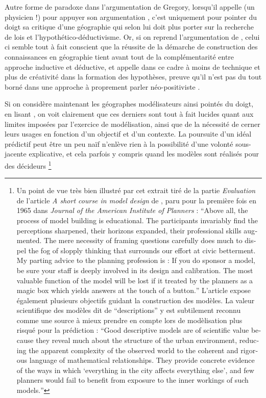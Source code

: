 Autre forme de paradoxe dans l'argumentation de Gregory, lorsqu'il appelle \textcite{Wilson1972} (un physicien !) pour appuyer son argumentation \autocite{Gregory1978}, c'est uniquement pour pointer du doigt sa critique d'une géographie qui selon lui doit plus porter sur la recherche de lois et l'hypothético-déductivisme. Or, si on reprend l'argumentation de \textcite{Wilson1972}, celui ci semble tout à fait conscient que la réussite de la démarche de construction des connaissances en géographie tient avant tout de la complémentarité entre approche inductive et déductive, et appelle dans ce cadre à moins de technique et plus de créativité dans la formation des hypothèses, preuve qu'il n'est pas du tout borné dans une approche à proprement parler néo-positiviste .

Si on considère maintenant les géographes modélisateurs ainsi pointés du doigt, en lisant \autocites{Chorley1967, Harvey1969, Hagget1965}, on voit clairement que ces derniers sont tout à fait lucides quant aux limites imposées par l'exercice de modélisation, ainsi que de la nécessité de cerner leurs usages en fonction d'un objectif et d'un contexte. La poursuite d'un idéal prédictif peut être un peu naïf n'enlève rien à la possibilité d'une volonté sous-jacente explicative, et cela parfois y compris quand les modèles sont réalisés pour des décideurs \footnote{ Un point de vue très bien illustré par cet extrait tiré de la partie \textit{Evaluation} de l'article \textit{A short course in model design} de \textcite[62]{Lowry1968}, paru pour la première fois en 1965 dans \textit{Journal of the American Institute of Planners} : \foreignquote{english}{Above all, the process of model building is educational. The participants invariably find the perceptions sharpened, their horizons expanded, their professional skills augmented. The mere necessity of framing questions carefully does much to dispel the fog of slopply thinking that surrounds our effort at civic betterment. My parting advice to the planning profession is : If you do sponsor a model, be sure your staff is deeply involved in its design and calibration. The most valuable function of the model will be lost if it treated by the planners as a magic box which yields answers at the touch of a button.} L'article expose également plusieurs objectifs guidant la construction des modèles. La valeur scientifique des modèles dit de \enquote{descriptions} y est subtilement reconnu comme une source à mieux prendre en compte lors de modèlisation plus risqué pour la prédiction : \foreignquote{english}{Good descriptive models are of scientific value because they reveal much about the structure of the urban environment, reducing the apparent complexity of the observed world to the coherent and rigorous language of mathematical relationships. They provide concrete evidence of the ways in which \enquote{everything in the city affects everything else}, and few planners would fail to benefit from exposure to the inner workings of such models.} }

